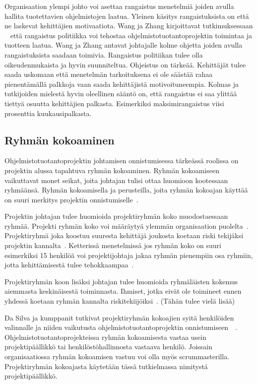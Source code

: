 \documentclass[finnish]{tktltiki2}
\theoremstyle{definition}
\theoremstyle{remark}
\begin{document}
Organisaation ylempi johto voi asettaa rangaistus menetelmiä joiden avulla hallita tuotettavien ohjelmistojen laatua. Yleinen käsitys rangaistuksista on että ne laskevat kehittäjien motivaatiota. Wang ja Zhang kirjoittavat tutkimuksessaan ~\cite{Wang:2010:PPP:1810295.1810302} että rangaistus politiikka voi tehostaa ohjelmistotuotantoprojektin toimintaa ja tuotteen laatua. Wang ja Zhang antavat johtajalle kolme ohjetta joiden avulla rangaistuksista saadaan toimivia. Rangaistus politiikan tulee olla oikeudenmukaista ja hyvin suunniteltua. Ohjeistus on tärkeää. Kehittäjät tulee saada uskomaan että menetelmän tarkoituksena ei ole säästää rahaa pienentämällä palkkoja vaan saada kehittäjistä motivoituneempia. Kolmas ja tutkijoiden mielestä hyvin oleellinen sääntö on, että rangaistus ei saa ylittää tiettyä osuutta kehittäjien palkasta. Esimerkiksi maksimirangaistus viisi prosenttia kuukausipalkasta.



\subsection{Ryhmän kokoaminen}


Ohjelmistotuotantoprojektin johtamisen onnistumisessa tärkeässä roolissa on projektin alussa tapahtuva ryhmän kokoaminen. Ryhmän kokoamiseen vaikuttavat monet seikat, joita johtajan tulisi ottaa huomioon kootessaan ryhmäänsä. Ryhmän kokoamisella ja perusteilla, joita ryhmän kokoajan käyttää on suuri merkitys projektin onnistumiselle~\cite{daSilva2012}. 

Projektin johtajan tulee huomioida projektiryhmän koko muodostaessaan ryhmää. Projekti ryhmän koko voi määräytyä ylemmän organisaation puolelta~\cite{McLeod:2011:FAS:1978802.1978803}. Projektiryhmä joka koostuu suuresta kehittäjä joukosta koetaan riski tekijäksi projektin kannalta~\cite{McLeod:2011:FAS:1978802.1978803}. Ketterissä menetelmissä jos ryhmän koko on suuri esimerkiksi 15 henkilöä voi projektijohtaja jakaa ryhmän pienempiin osa ryhmiin, jotta kehittämisestä tulee tehokkaampaa~\cite{Augustine:2005:APM:1101779.1101781}. 

Projektiryhmän koon lisäksi johtajan tulee huomioida ryhmäläisten kokemus aiemmasta keskinäisestä toiminnasta. Ihmiset, jotka eivät ole toimineet ennen yhdessä koetaan ryhmän kannalta riskitekiijöiksi~\cite{McLeod:2011:FAS:1978802.1978803}. (Tähän tulee vielä lisää)

Da Silva ja kumppanit tutkivat projektiryhmän kokoajien syitä henkilöiden valinnalle ja niiden vaikutusta ohjelmistotuotantoprojektin onnistumiseen~\cite{daSilva2012}~\cite{francca2009quantitative}. Ohjelmistotuotantoprojekteissa ryhmän kokoamisesta vastaa usein projektipäällikkö tai henkilöstöhallinnosta vastaava henkilö. Joissain organisaatiossa ryhmän kokoamisen vastuu voi olla myös scrummasterilla. Projektiryhmän kokoajasta käytetään tässä tutkielmassa nimitystä projektipäällikkö. 
\end{document}
